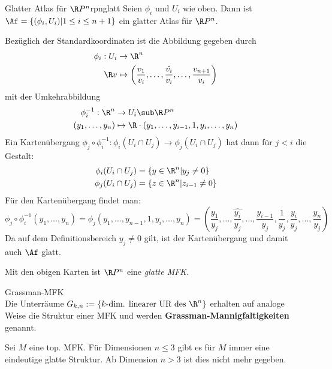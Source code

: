 \begin{satz}{Glatter Atlas für $\R P^n$}{rpnglatt}
Seien $\phi_i$ und $U_i$ wie oben. Dann ist $\Af = \{ (\phi_i, U_i) | 1 \leq i \leq n+1 \}$ ein glatter Atlas für $\R P^n$.
\end{satz}
\begin{beweis}
Bezüglich der Standardkoordinaten ist die Abbildung gegeben durch
\begin{align}
\phi_i : U_i & \to \R^n \\
\R v & \mapsto \left( \frac{v_1}{v_i}, \dots, \hat{\frac{v_i}{v_i}}, \dots, \frac{v_{n+1}}{v_i}\right)
\end{align}
mit der Umkehrabbildung
\begin{align}
\phi_i^{-1}: \R^n &\to U_i \sub \R P^n \\
(y_1, \dots, y_n) &\mapsto \R \cdot (y_1, \dots, y_{i-1}, 1, y_i, \dots, y_n)
\end{align}
Ein Kartenübergang $\phi_j \circ \phi_i ^{-1} : \phi_i (U_i \cap U_j) \to \phi_j (U_i \cap U_j)$ hat dann für $j < i$ die Gestalt:
\begin{align}
\phi_i (U_i \cap U_j) &= \{ y \in \R^n | y_j \neq 0 \} \\
\phi_j (U_i \cap U_j) &= \{z \in \R^n | z_{i-1} \neq 0 \}
\end{align}
Für den Kartenübergang findet man:
\begin{equation}
\phi_j \circ \phi_i^{-1} (y_1, \dots, y_n) = \phi_j (y_1, \dots, y_{n-1}, 1, y_i, \dots, y_n) = \left(\frac{y_1}{y_j}, \dots, \hat{\frac{y_i}{y_j}},\dots, \frac{y_{i-1}}{y_j}, \frac{1}{y_j}, \frac{y_{i}}{y_j}, \dots, \frac{y_{n}}{y_j} \right)
\end{equation}
Da auf dem Definitionsbereich $y_j \neq 0$ gilt, ist der Kartenübergang und damit auch $\Af$ glatt.
\end{beweis}
\begin{korollar}{}{}
Mit den obigen Karten ist $\R P^n$ eine \textit{glatte MFK}.
\end{korollar}
\begin{bemerkung}Grassman-MFK\\
Die Unterräume $G_{k, n} := \{ k \text{-dim. linearer UR des} \ \R^n \}$ erhalten auf analoge Weise die Struktur einer MFK und werden \textbf{Grassman-Mannigfaltigkeiten} genannt.
\end{bemerkung}
Sei $M$ eine top. MFK. Für Dimensionen $n \leq 3$ gibt es für $M$ immer eine eindeutige glatte Struktur. Ab Dimension $n > 3$ ist dies nicht mehr gegeben.
